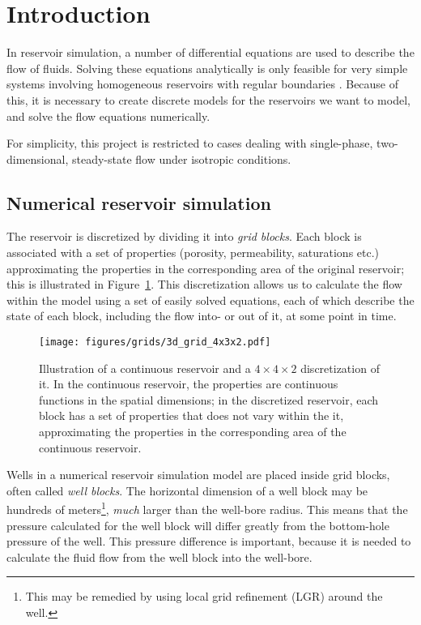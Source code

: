
\section{Introduction} %
\label{sec:introduction}
In reservoir simulation, a number of differential equations are used to describe the flow of fluids. Solving these equations analytically is only feasible for very simple systems involving homogeneous reservoirs with regular boundaries \cite{Peaceman1977Fundamentals}. Because of this, it is necessary to create discrete models for the reservoirs we want to model, and solve the flow equations numerically.

For simplicity, this project is restricted to cases dealing with single-phase, two-dimensional, steady-state flow under isotropic conditions.

\subsection{Numerical reservoir simulation} %
\label{sub:numerical_reservoir_simulation}


The reservoir is discretized by dividing it into \emph{grid blocks}. Each block is associated with a set of properties (porosity, permeability, saturations etc.) approximating the properties in the corresponding area of the original reservoir; this is illustrated in Figure~\ref{fig:grid-discretization}. This discretization allows us to calculate the flow within the model using a set of easily solved equations, each of which describe the state of each block, including the flow into- or out of it, at some point in time.

\begin{figure}[htbp]
    \centering
    \texttt{[image: figures/grids/3d\_grid\_4x3x2.pdf]}
    \caption{Illustration of a continuous reservoir and a $4\times 4\times 2$ discretization of it. In the continuous reservoir, the properties are continuous functions in the spatial dimensions; in the discretized reservoir, each block has a set of properties that does not vary within the it, approximating the properties in the corresponding area of the continuous reservoir.}
    \label{fig:grid-discretization}
\end{figure}


Wells in a numerical reservoir simulation model are placed inside grid blocks, often called \emph{well blocks}. The horizontal dimension of a well block may be hundreds of meters\footnote{This may be remedied by using local grid refinement (LGR) around the well.}, \emph{much} larger than the well-bore radius. This means that the pressure calculated for the well block will differ greatly from the bottom-hole pressure of the well. This pressure difference is important, because it is needed to calculate the fluid flow  from the well block into the well-bore.

